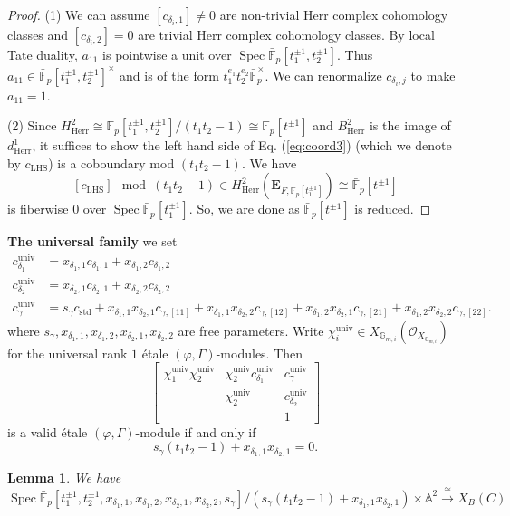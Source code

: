 \documentclass[11pt]{amsart}
\newcommand{\MINOREDITED}[1]{#1}
\newtheorem{lem}[thm]{Lemma}
\theoremstyle{definition}
\newcommand{\G}{\mathbb{G}}
\newcommand{\A}{\mathbb{A}}
\newcommand{\bfE}{\mathbf{E}}
\newcommand{\bFp}{\bar{\mathbb{F}}_p}
\newcommand{\cO}{\mathcal{O}}
\newcommand{\univ}{{\operatorname{univ}}}
\DeclareMathOperator{\std}{std}
\DeclareMathOperator{\LHS}{LHS}
\DeclareMathOperator{\Spec}{Spec}
\newcommand{\Herr}{\mathrm{Herr}}
\begin{document}
\begin{proof}
(1)
We can assume $[c_{\delta_i,1}]\neq 0$
are non-trivial Herr complex cohomology classes
and $[c_{\delta_i,2}]=0$
are trivial  Herr complex cohomology classes.
By local Tate duality, $a_{11}$
is pointwise a unit over
$\Spec \bFp[t_1^{\pm1}, t_2^{\pm1}]$.
Thus $a_{11}\in \bFp[t_1^{\pm1}, t_2^{\pm1}]^\times$
and is of the form $t_1^{e_1}t_2^{e_2}\bFp^\times$.
We can renormalize $c_{\delta_i,j}$
to make $a_{11}=1$.

(2) Since $H_{\Herr}^2\cong \bFp[t_1^{\pm1}, t_2^{\pm1}]/(t_1t_2-1)\cong \bFp[t^{\pm1}]$
and $B_{\Herr}^2$ 
\MINOREDITED{is the image of $d^1_{\Herr}$},
it suffices to show
the left hand side of Eq. (\ref{eq:coord3})
(which we denote by $c_{\LHS}$)
is a coboundary
mod $(t_1t_2-1)$.
We have 
\[
[c_{\LHS}] \mod (t_1t_2-1) \in H^2_{\Herr}(\bfE_{F, \bFp[t_1^{\pm1}]})\cong \bFp[t^{\pm1}]
\]
is fiberwise $0$
over $\Spec \bFp[t_1^{\pm1}]$.
So, we are done as $\bFp[t^{\pm1}]$ is reduced.
\end{proof}

\vspace{3mm}

\noindent
{\bf The universal family}
we set
\begin{align*}
c_{\delta_1}^\univ&= x_{\delta_1,1} c_{\delta_1,1}+x_{\delta_1,2}c_{\delta_1,2}\\
c_{\delta_2}^\univ&= x_{\delta_2,1} c_{\delta_2,1}+x_{\delta_2,2}c_{\delta_2,2}\\
c_{\gamma}^\univ&= s_\gamma c_{\std} + x_{\delta_1,1}x_{\delta_2,1} c_{\gamma,[11]}
+ x_{\delta_1,1}x_{\delta_2,2}c_{\gamma,[12]}
+x_{\delta_1,2}x_{\delta_2,1}c_{\gamma,[21]}+x_{\delta_1,2}
x_{\delta_2,2}c_{\gamma,[22]}.
\end{align*}
where $s_\gamma,x_{\delta_1,1},x_{\delta_1,2},x_{\delta_2,1},x_{\delta_2,2}$ are free parameters.
Write $\chi_i^\univ\in X_{\G_{m,i}}(\cO_{X_{\G_{m,i}}})$
for the universal rank $1$ \'etale $(\varphi, \Gamma)$-modules.
Then
\[
\begin{bmatrix}
\chi_1^\univ\chi_2^\univ & \chi_2^\univ c_{\delta_1}^\univ & c_{\gamma}^\univ \\
& \chi_2^\univ & c_{\delta_2}^\univ\\
& & 1
\end{bmatrix}
\]
is a valid \'etale $(\varphi, \Gamma)$-module
if and only if
\[
s_\gamma(t_1t_2-1)
+ x_{\delta_1,1}x_{\delta_2,1}=0.
\]

\begin{lem}
We have \[
\Spec \bFp[t_1^{\pm1},t_2^{\pm1}, 
x_{\delta_1,1},x_{\delta_1,2},x_{\delta_2,1},x_{\delta_2,2},s_\gamma]
/(s_\gamma(t_1t_2-1)
+ x_{\delta_1,1}x_{\delta_2,1})\times \A^2
\xrightarrow{\cong}
X_{B}(C)
\]
\end{lem}
\end{document}
